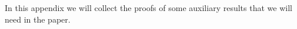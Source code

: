 In this appendix we will collect the proofs of some auxiliary results that we will need in the paper. 

